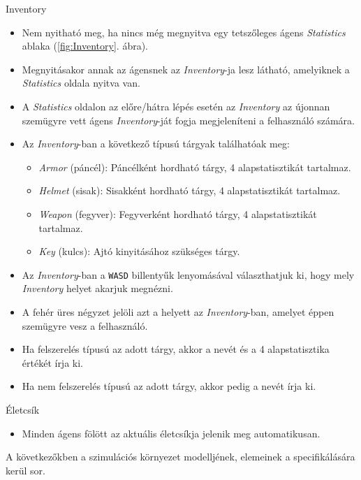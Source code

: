\noindent Inventory

\begin{itemize}
    \item Nem nyitható meg, ha nincs még megnyitva egy tetszőleges ágens \textit{Statistics} ablaka (\ref{fig:Inventory}. ábra).
    \item Megnyitásakor annak az ágensnek az \textit{Inventory}-ja lesz látható, amelyiknek a \textit{Statistics} oldala nyitva van.
    \item A \textit{Statistics} oldalon az előre/hátra lépés esetén az \textit{Inventory} az újonnan szemügyre vett ágens \textit{Inventory}-ját fogja megjeleníteni a felhasználó számára.
    \item Az \textit{Inventory}-ban a következő típusú tárgyak találhatóak meg:
    \begin{itemize}
    \item \textit{Armor} (páncél): Páncélként hordható tárgy, 4 alapstatisztikát tartalmaz.
    \item \textit{Helmet} (sisak): Sisakként hordható tárgy, 4 alapstatisztikát tartalmaz.
    \item \textit{Weapon} (fegyver): Fegyverként hordható tárgy, 4 alapstatisztikát tartalmaz.
    \item \textit{Key} (kulcs): Ajtó kinyitásához szükséges tárgy.
    \end{itemize}
    \item Az \textit{Inventory}-ban a \texttt{WASD} billentyűk lenyomásával választhatjuk ki, hogy mely \textit{Inventory} helyet akarjuk megnézni.
    \item A fehér üres négyzet jelöli azt a helyett az \textit{Inventory}-ban, amelyet éppen szemügyre vesz a felhasználó.
    \item Ha felszerelés típusú az adott tárgy, akkor a nevét és a 4 alapstatisztika értékét írja ki.
    \item Ha nem felszerelés típusú az adott tárgy, akkor pedig a nevét írja ki.
\end{itemize}

\noindent Életcsík

\begin{itemize}
    \item Minden ágens fölött az aktuális életcsíkja jelenik meg automatikusan.
\end{itemize}



A következőkben a szimulációs környezet modelljének, elemeinek a specifikálására kerül sor.

